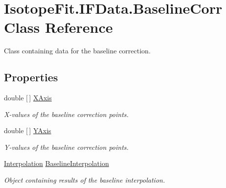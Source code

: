 \hypertarget{class_isotope_fit_1_1_i_f_data_1_1_baseline_corr}{}\section{Isotope\+Fit.\+I\+F\+Data.\+Baseline\+Corr Class Reference}
\label{class_isotope_fit_1_1_i_f_data_1_1_baseline_corr}


Class containing data for the baseline correction.  


\subsection*{Properties}
\begin{DoxyCompactItemize}
\item 
\mbox{\label{class_isotope_fit_1_1_i_f_data_1_1_baseline_corr_a90e35ea8c62d07f0279f4b5f7d440491}} 
double \mbox{[}$\,$\mbox{]} \hyperlink{class_isotope_fit_1_1_i_f_data_1_1_baseline_corr_a90e35ea8c62d07f0279f4b5f7d440491}{X\+Axis}
\begin{DoxyCompactList}\small\item\em X-\/values of the baseline correction points. \end{DoxyCompactList}\item 
double \mbox{[}$\,$\mbox{]} \hyperlink{class_isotope_fit_1_1_i_f_data_1_1_baseline_corr_aa71067f79827da27836daa705413133c}{Y\+Axis}
\begin{DoxyCompactList}\small\item\em Y-\/values of the baseline correction points. \end{DoxyCompactList}\item 
\hyperlink{class_isotope_fit_1_1_interpolation}{Interpolation} \hyperlink{class_isotope_fit_1_1_i_f_data_1_1_baseline_corr_a914a7b2ac945482a7c73874fbff45951}{Baseline\+Interpolation}
\begin{DoxyCompactList}\small\item\em Object containing results of the baseline interpolation. \end{DoxyCompactList}\end{DoxyCompactItemize}


